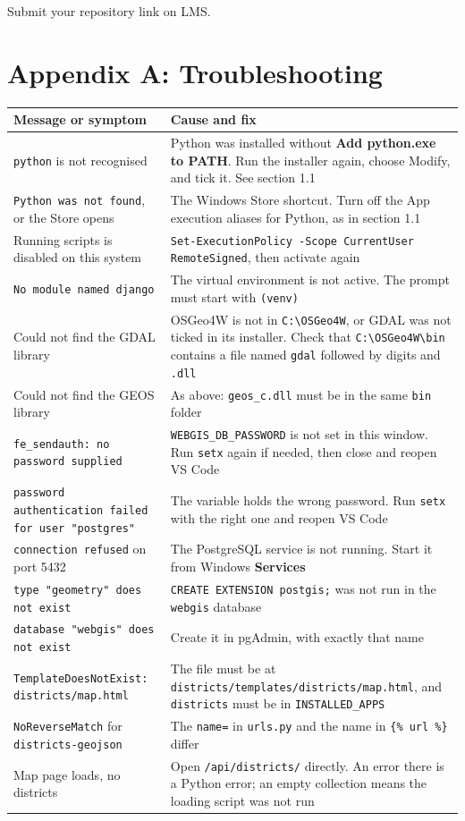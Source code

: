 \documentclass{article}
\newcommand{\cd}[1]{\texttt{#1}}
\begin{document}
\vspace{1em}
Submit your repository link on LMS.


\section*{Appendix A: Troubleshooting}

\begin{tabularx}{\textwidth}{@{}L{5cm} X@{}}
\toprule
\textbf{Message or symptom} & \textbf{Cause and fix} \\
\midrule
\cd{python} is not recognised &
  Python was installed without \textbf{Add python.exe to PATH}. Run the
  installer again, choose Modify, and tick it. See section 1.1 \\
\cd{Python was not found}, or the Store opens &
  The Windows Store shortcut. Turn off the App execution aliases for
  Python, as in section 1.1 \\
Running scripts is disabled on this system &
  \cd{Set-ExecutionPolicy -Scope CurrentUser RemoteSigned}, then
  activate again \\
\cd{No module named django} &
  The virtual environment is not active. The prompt must start with
  \cd{(venv)} \\
Could not find the GDAL library &
  OSGeo4W is not in \cd{C:\textbackslash OSGeo4W}, or GDAL was not
  ticked in its installer. Check that
  \cd{C:\textbackslash OSGeo4W\textbackslash bin} contains a file named
  \cd{gdal} followed by digits and \cd{.dll} \\
Could not find the GEOS library &
  As above: \cd{geos\_c.dll} must be in the same \cd{bin} folder \\
\cd{fe\_sendauth: no password supplied} &
  \cd{WEBGIS\_DB\_PASSWORD} is not set in this window. Run \cd{setx}
  again if needed, then close and reopen VS Code \\
\cd{password authentication failed for user "postgres"} &
  The variable holds the wrong password. Run \cd{setx} with the right one
  and reopen VS Code \\
\cd{connection refused} on port 5432 &
  The PostgreSQL service is not running. Start it from Windows
  \textbf{Services} \\
\cd{type "geometry" does not exist} &
  \cd{CREATE EXTENSION postgis;} was not run in the \cd{webgis} database \\
\cd{database "webgis" does not exist} &
  Create it in pgAdmin, with exactly that name \\
\cd{TemplateDoesNotExist: districts/map.html} &
  The file must be at
  \cd{districts/templates/districts/map.html}, and \cd{districts} must be
  in \cd{INSTALLED\_APPS} \\
\cd{NoReverseMatch} for \cd{districts-geojson} &
  The \cd{name=} in \cd{urls.py} and the name in \cd{\{\% url \%\}} differ \\
Map page loads, no districts &
  Open \cd{/api/districts/} directly. An error there is a Python error;
  an empty collection means the loading script was not run \\
\bottomrule
\end{tabularx}
\end{document}

